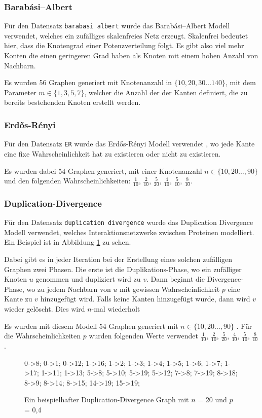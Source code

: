 \documentclass[12pt,a4paper,onecolumn,oneside,titlepage]{article}
\newcommand{\vars}{\texttt}
\begin{document}
\subsubsection{Barabási–Albert}
Für den Datensatz \vars{barabasi albert} wurde das Barabási–Albert Modell verwendet, welches ein zufälliges skalenfreies Netz erzeugt\cite{Albert02}.
Skalenfrei bedeutet hier, dass die Knotengrad einer Potenzverteilung folgt. Es gibt also viel mehr Konten die einen geringeren Grad haben als Knoten mit einem hohen Anzahl von Nachbarn. 

Es wurden 56 Graphen generiert mit Knotenanzahl in $\{10,20,30…140\}$, mit dem Parameter $m \in \{1,3,5,7\}$, welcher die Anzahl der der Kanten definiert, die zu bereits bestehenden Knoten erstellt werden.
\subsubsection{Erdős-Rényi}
Für den Datensatz \vars{ER} wurde das Erdős-Rényi Modell verwendet\cite{Gilbert59} \cite{Batagelj05}, wo jede Kante eine fixe Wahrscheinlichkeit hat zu existieren oder nicht zu existieren.

Es wurden dabei 54 Graphen generiert, mit einer Knotenanzahl $n \in \{10,20…,90\}$ und den folgenden Wahrscheinlichkeiten: $\frac{1}{10}$, $\frac{2}{10}$, $\frac{5}{20}$, $\frac{4}{10}$, $\frac{5}{10}$, $\frac{8}{10}$.


\subsubsection{Duplication-Divergence}
Für den Datensatz \vars{duplication divergence} wurde das Duplication Divergence Modell verwendet\cite{Ispolatov05}, welches Interaktionsnetzwerke zwischen Proteinen modelliert. Ein Beispiel ist in Abbildung \ref{fig:duplication-divergence} zu sehen.

Dabei gibt es in jeder Iteration bei der Erstellung eines solchen zufälligen Graphen zwei Phasen. Die erste ist die Duplikations-Phase, wo ein zufälliger Knoten $u$ genommen und dupliziert wird zu $v$. Dann beginnt die Divergence-Phase, wo zu jedem Nachbarn von $u$ mit gewissen Wahrscheinlichkeit $p$ eine Kante zu $v$ hinzugefügt wird. Falls keine Kanten hinzugefügt wurde, dann wird $v$ wieder gelöscht. Dies wird $n$-mal wiederholt 

Es wurden mit diesem Modell 54 Graphen generiert mit $n \in \{10,20…,90\}$ . Für die Wahrscheinlichkeiten $p$ wurden folgenden Werte verwendet $\frac{1}{10}$, $\frac{2}{10}$, $\frac{5}{20}$, $\frac{4}{10}$, $\frac{5}{10}$, $\frac{8}{10}$.
\begin{figure}
{
0->8;
0->1;
0->12;
1->16;
1->2;
1->3;
1->4;
1->5;
1->6;
1->7;
1->17;
1->11;
1->13;
5->8;
5->10;
5->19;
5->12;
7->8;
7->19;
8->18;
8->9;
8->14;
8->15;
14->19;
15->19;
}
\caption{Ein beispielhafter Duplication-Divergence Graph mit $n$ = 20 und $p$ = 0,4}
\label{fig:duplication-divergence}
\end{figure}
\end{document}
